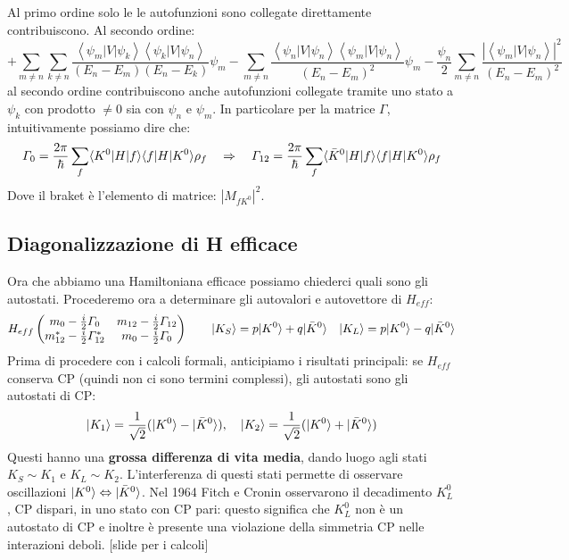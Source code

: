 Al primo ordine solo le le autofunzioni sono collegate direttamente contribuiscono. Al secondo ordine:
\begin{equation*}
    +\sum_{m \neq n} \sum_{k \neq n} \frac{\left\langle\psi_m|V| \psi_k\right\rangle\left\langle\psi_k|V| \psi_n\right\rangle}{\left(E_n-E_m\right)\left(E_n-E_k\right)} \psi_m-\sum_{m \neq n} \frac{\left\langle\psi_n|V| \psi_n\right\rangle\left\langle\psi_m|V| \psi_n\right\rangle}{\left(E_n-E_m\right)^2} \psi_m-\frac{\psi_n}{2} \sum_{m \neq n} \frac{\left|\left\langle\psi_m|V| \psi_n\right\rangle\right|^2}{\left(E_n-E_m\right)^2}
\end{equation*}
al secondo ordine contribuiscono anche autofunzioni collegate tramite uno stato a $\psi_k$ con prodotto $\ne0$ sia con $\psi_n$ e $\psi_m$. In particolare per la matrice $\Gamma$, intuitivamente possiamo dire che:
\begin{equation*}
    \Gamma_0=\frac{2\pi}{\hbar}\sum_f\langle K^0|H|f\rangle\langle f|H|K^0\rangle\rho_f \quad \Rightarrow\quad \Gamma_{12}=\frac{2\pi}{\hbar}\sum_f\langle \Bar{K}^0|H|f\rangle\langle f|H|K^0\rangle\rho_f
\end{equation*}
Dove il braket è l'elemento di matrice: $|M_{fK^0}|^2$.
\subsection{Diagonalizzazione di H efficace}
Ora che abbiamo una Hamiltoniana efficace possiamo chiederci quali sono gli autostati. Procederemo ora a determinare gli autovalori e autovettore di $H_{eff}$:
\begin{equation*}
    H_{eff}\begin{pmatrix}
        m_0-\frac{i}{2}\Gamma_0 & m_{12}-\frac{i}{2}\Gamma_{12} \\ m^*_{12}-\frac{i}{2}\Gamma^*_{12} & m_0-\frac{i}{2}\Gamma_0
    \end{pmatrix} \qquad |K_S\rangle=p|K^0\rangle+q|\Bar{K}^0\rangle \quad |K_L\rangle=p|K^0\rangle-q|\Bar{K}^0\rangle
\end{equation*}
Prima di procedere con i calcoli formali, anticipiamo i risultati principali: se $H_{eff}$ conserva CP (quindi non ci sono termini complessi), gli autostati sono gli autostati di CP:
\begin{equation*}
    |K_1\rangle=\frac{1}{\sqrt{2}}(|K^0\rangle-|\Bar{K}^0\rangle), \quad |K_2\rangle=\frac{1}{\sqrt{2}}(|K^0\rangle+|\Bar{K}^0\rangle)
\end{equation*}
Questi hanno una \textbf{grossa differenza di vita media}, dando luogo agli stati $K_S\sim K_1$ e $K_L\sim K_2$. L'interferenza di questi stati permette di osservare oscillazioni $|K^0\rangle\Leftrightarrow|\Bar{K}^0\rangle$. Nel 1964 Fitch e Cronin osservarono il decadimento $K^0_L$, CP dispari, in uno stato con CP pari: questo significa che $K^0_L$ non è un autostato di CP e inoltre è presente una violazione della simmetria CP nelle interazioni deboli. [slide per i calcoli]